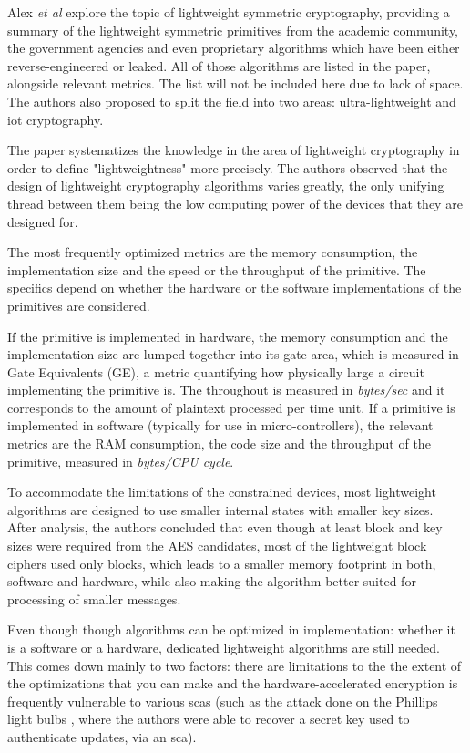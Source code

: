 \documentclass{llncs}
\begin{document}
Alex \textit{et al}\cite{Stateoft96:online} explore the topic of lightweight symmetric cryptography,
providing a summary of the lightweight symmetric
primitives from the academic community, the government agencies and even proprietary
algorithms which have been either reverse-engineered or leaked. All of those algorithms
are listed in the paper, alongside relevant metrics. The list will not be
included here due to lack of space. The authors also proposed
to split the field into two areas: ultra-lightweight and \gls{iot} cryptography.

The paper systematizes the knowledge in the area of lightweight cryptography
in order to define "lightweightness" more precisely. The authors observed that the design
of lightweight cryptography algorithms varies greatly, the only unifying thread
between them being the low computing power of the devices that they are designed for.

The most frequently optimized metrics are the memory consumption, the implementation size
and the speed or the throughput of the primitive. The specifics depend on whether
the hardware or the software implementations of the primitives are considered.

If the primitive is implemented in hardware, the memory consumption and the implementation
size are lumped together into its gate area, which is measured in Gate Equivalents (GE),
a metric quantifying how physically large a circuit implementing the primitive is.
The throughout is measured in \textit{bytes/sec} and it corresponds to the amount of plaintext
processed per time unit. If a primitive is implemented in software (typically for
use in micro-controllers), the relevant metrics are the RAM consumption, the code
size and the throughput of the primitive, measured in \textit{bytes/CPU cycle}.

To accommodate the limitations of the constrained devices, most lightweight algorithms
are designed to use smaller internal states with smaller key sizes. After analysis,
the authors concluded that even though at least  block and
key sizes were required from the AES candidates, most of the lightweight
block ciphers used only  blocks, which leads to a smaller memory
footprint in both, software and hardware, while also making the algorithm better suited
for processing of smaller messages.

Even though though algorithms can be optimized in implementation: whether it is
a software or a hardware, dedicated lightweight algorithms are still needed.
This comes down mainly to two factors: there are limitations to the the extent of
the optimizations that you can make and the hardware-accelerated encryption is
frequently vulnerable to various \gls{sca}s (such as the attack done on the
Phillips light bulbs \cite{cryptoeprint:2016:1047}, where the authors were able to
recover a secret key used to authenticate updates, via an \gls{sca}).
\end{document}
